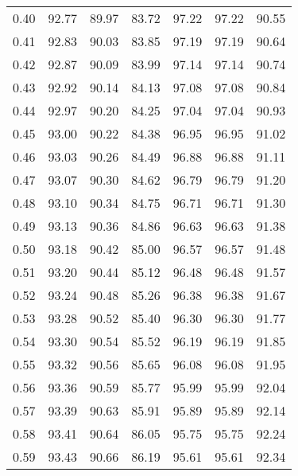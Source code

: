 \begin{tabular}{|c|c|c|c|c|c|c|}
      0.40 &     92.77 &     89.97 &      83.72 &   97.22 &      97.22 &         90.55 \\
      0.41 &     92.83 &     90.03 &      83.85 &   97.19 &      97.19 &         90.64 \\
      0.42 &     92.87 &     90.09 &      83.99 &   97.14 &      97.14 &         90.74 \\
      0.43 &     92.92 &     90.14 &      84.13 &   97.08 &      97.08 &         90.84 \\
      0.44 &     92.97 &     90.20 &      84.25 &   97.04 &      97.04 &         90.93 \\
      0.45 &     93.00 &     90.22 &      84.38 &   96.95 &      96.95 &         91.02 \\
      0.46 &     93.03 &     90.26 &      84.49 &   96.88 &      96.88 &         91.11 \\
      0.47 &     93.07 &     90.30 &      84.62 &   96.79 &      96.79 &         91.20 \\
      0.48 &     93.10 &     90.34 &      84.75 &   96.71 &      96.71 &         91.30 \\
      0.49 &     93.13 &     90.36 &      84.86 &   96.63 &      96.63 &         91.38 \\
      0.50 &     93.18 &     90.42 &      85.00 &   96.57 &      96.57 &         91.48 \\
      0.51 &     93.20 &     90.44 &      85.12 &   96.48 &      96.48 &         91.57 \\
      0.52 &     93.24 &     90.48 &      85.26 &   96.38 &      96.38 &         91.67 \\
      0.53 &     93.28 &     90.52 &      85.40 &   96.30 &      96.30 &         91.77 \\
      0.54 &     93.30 &     90.54 &      85.52 &   96.19 &      96.19 &         91.85 \\
      0.55 &     93.32 &     90.56 &      85.65 &   96.08 &      96.08 &         91.95 \\
      0.56 &     93.36 &     90.59 &      85.77 &   95.99 &      95.99 &         92.04 \\
      0.57 &     93.39 &     90.63 &      85.91 &   95.89 &      95.89 &         92.14 \\
      0.58 &     93.41 &     90.64 &      86.05 &   95.75 &      95.75 &         92.24 \\
      0.59 &     93.43 &     90.66 &      86.19 &   95.61 &      95.61 &         92.34 \\

\end{tabular}
